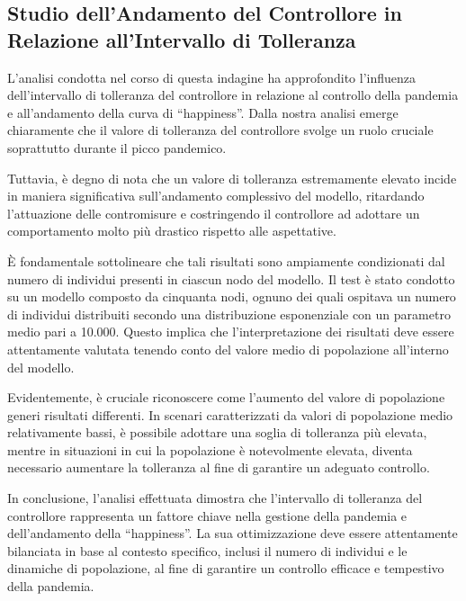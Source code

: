 \subsection{Studio dell'Andamento del Controllore in Relazione all'Intervallo di Tolleranza}
L'analisi condotta nel corso di questa indagine ha approfondito 
l'influenza dell'intervallo di tolleranza del controllore in relazione 
al controllo della pandemia e all'andamento della curva di ``happiness''. 
Dalla nostra analisi emerge chiaramente che il valore di tolleranza del 
controllore svolge un ruolo cruciale soprattutto durante il picco pandemico.

Tuttavia, è degno di nota che un valore di tolleranza estremamente 
elevato incide in maniera significativa sull'andamento complessivo del 
modello, ritardando l'attuazione delle contromisure e costringendo il 
controllore ad adottare un comportamento molto più drastico rispetto alle 
aspettative.

È fondamentale sottolineare che tali risultati sono ampiamente 
condizionati dal numero di individui presenti in ciascun nodo del modello. 
Il test è stato condotto su un modello composto da cinquanta nodi, ognuno 
dei quali ospitava un numero di individui distribuiti secondo una 
distribuzione esponenziale con un parametro medio pari a 10.000. 
Questo implica che l'interpretazione dei risultati deve essere 
attentamente valutata tenendo conto del valore medio di popolazione 
all'interno del modello.

Evidentemente, è cruciale riconoscere come l'aumento del valore di 
popolazione generi risultati differenti. In scenari caratterizzati da 
valori di popolazione medio relativamente bassi, è possibile adottare 
una soglia di tolleranza più elevata, mentre in situazioni in cui la 
popolazione è notevolmente elevata, diventa necessario aumentare la 
tolleranza al fine di garantire un adeguato controllo.

In conclusione, l'analisi effettuata dimostra che l'intervallo di 
tolleranza del controllore rappresenta un fattore chiave nella gestione 
della pandemia e dell'andamento della ``happiness''. La sua ottimizzazione 
deve essere attentamente bilanciata in base al contesto specifico, inclusi 
il numero di individui e le dinamiche di popolazione, al fine di garantire 
un controllo efficace e tempestivo della pandemia.

